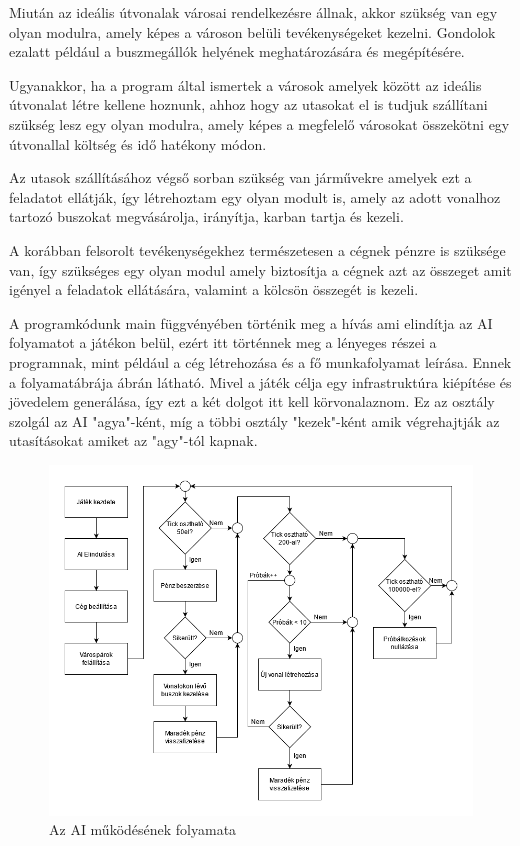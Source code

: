 Miután az ideális útvonalak városai rendelkezésre állnak, akkor szükség van egy olyan modulra, amely képes a városon belüli tevékenységeket kezelni. Gondolok ezalatt például a buszmegállók helyének meghatározására és megépítésére.

Ugyanakkor, ha a program által ismertek a városok amelyek között az ideális útvonalat létre kellene hoznunk, ahhoz hogy az utasokat el is tudjuk szállítani szükség lesz egy olyan modulra, amely képes a megfelelő városokat összekötni egy útvonallal költség és idő hatékony módon.

Az utasok szállításához végső sorban szükség van járművekre amelyek ezt a feladatot ellátják, így létrehoztam egy olyan modult is, amely az adott vonalhoz tartozó buszokat megvásárolja, irányítja, karban tartja és kezeli.

A korábban felsorolt tevékenységekhez természetesen a cégnek pénzre is szüksége van, így szükséges egy olyan modul amely biztosítja a cégnek azt az összeget amit igényel a feladatok ellátására, valamint a kölcsön összegét is kezeli.



A programkódunk main függvényében történik meg a hívás ami elindítja az AI folyamatot a játékon belül, ezért itt történnek meg a lényeges részei a programnak, mint például a cég létrehozása és a fő munkafolyamat leírása. Ennek a folyamatábrája  ábrán látható. Mivel a játék célja egy infrastruktúra kiépítése és jövedelem generálása, így ezt a két dolgot itt kell körvonalaznom. Ez az osztály szolgál az AI "agya"-ként, míg a többi osztály "kezek"-ként amik végrehajtják az utasításokat amiket az "agy"-tól kapnak.

\begin{figure}
	\centering
	\includegraphics[width=\textwidth]{images/folyamat.png}
	\caption{Az AI működésének folyamata}
	\label{fig:folyamat}
\end{figure}

